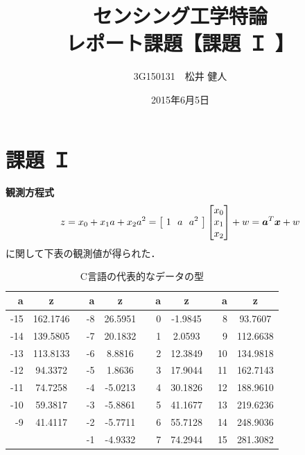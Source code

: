 \documentclass[a4paper]{jarticle}
\begin{document}
\title{センシング工学特論\\レポート課題【課題 Ｉ 】}
\author{3G150131　松井 健人}
\date{2015年6月5日}
\maketitle


\section{課題 Ｉ }
\textbf{観測方程式}
\begin{equation}
z = x_0 + {x_1}a + {x_2}{a^2} = 
\left[  \ 1\ \ a\ \ a^2\   \right]
 \begin{bmatrix}
{x_0} \\ {x_1} \\{x_2} \\ 
\end{bmatrix}   + w= 
\mbox{\boldmath $a$}^{T}\mbox{\boldmath $x$} + w
\end{equation}
に関して下表の観測値が得られた．

\begin{table}[hbtp]
 \caption{C言語の代表的なデータの型}
 \label{table:data_type}
 \begin{center}
  \begin{tabular}{rc|rc|rc|rc}
   \hline
   a & z &　a & z &　a & z&　a & z \\
   \hline \hline
   -15 & 162.1746 & -8& 26.5951 & 0 & -1.9845  & 8 & 93.7607\\
   -14 & 139.5805 & -7 & 20.1832 & 1 & 2.0593  & 9 & 112.6638\\
   -13 & 113.8133 & -6 &  8.8816 & 2 & 12.3849  & 10 & 134.9818 \\
   -12 & 94.3372  & -5 &   1.8636 & 3 & 17.9044  & 11 &162.7143\\
   -11 & 74.7258  & -4 &  -5.0213& 4 & 30.1826  & 12 &188.9610 \\
   -10 & 59.3817  & -3 & -5.8861 & 5 & 41.1677  & 13 &219.6236 \\
   -9  & 41.4117   & -2 &   -5.7711& 6 & 55.7128 & 14 & 248.9036 \\
        &               & -1 &   -4.9332& 7&  74.2944  & 15 & 281.3082\\
   \hline
  \end{tabular}
 \end{center}
\end{table}
\end{document}
